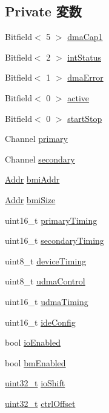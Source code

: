 \subsection*{Private 変数}
\begin{DoxyCompactItemize}
\item 
Bitfield$<$ 5 $>$ \hyperlink{classIdeController_aba4f51816e2ec54f12f4c9724d3b281f}{dmaCap1}
\item 
Bitfield$<$ 2 $>$ \hyperlink{classIdeController_a6bf8072c32ffee0d4d03eb90ce4a3810}{intStatus}
\item 
Bitfield$<$ 1 $>$ \hyperlink{classIdeController_a3f71da290d4bdbfb6f14d5055a556d20}{dmaError}
\item 
Bitfield$<$ 0 $>$ \hyperlink{classIdeController_a12698e64814a9728d71424fcf5148f4d}{active}
\item 
Bitfield$<$ 0 $>$ \hyperlink{classIdeController_ace5af3160a3a76b4a51e864f74b16ae5}{startStop}
\item 
Channel \hyperlink{classIdeController_ab99c7b03cc88be094081c9dee0d4f3d7}{primary}
\item 
Channel \hyperlink{classIdeController_a9ffe401d4b082d4a20f74809ed096f62}{secondary}
\item 
\hyperlink{base_2types_8hh_af1bb03d6a4ee096394a6749f0a169232}{Addr} \hyperlink{classIdeController_aeea2cd1022ed55ebf9ba284ea44b1b3b}{bmiAddr}
\item 
\hyperlink{base_2types_8hh_af1bb03d6a4ee096394a6749f0a169232}{Addr} \hyperlink{classIdeController_a52be8db14c9c7207569db87b8a153c08}{bmiSize}
\item 
uint16\_\-t \hyperlink{classIdeController_ae3a3e441e5eccb9c386260eeb3968878}{primaryTiming}
\item 
uint16\_\-t \hyperlink{classIdeController_a1611c0c216198aa88de03e3ebfd22b43}{secondaryTiming}
\item 
uint8\_\-t \hyperlink{classIdeController_a11159e29742cfa070446c2ae522aadb2}{deviceTiming}
\item 
uint8\_\-t \hyperlink{classIdeController_a3bc817e4be51f2e1aeb1701ce144cbf1}{udmaControl}
\item 
uint16\_\-t \hyperlink{classIdeController_af5a85382debfe463bfebc5ab59624aa5}{udmaTiming}
\item 
uint16\_\-t \hyperlink{classIdeController_accc39274caa412bf5447d8fad2822dda}{ideConfig}
\item 
bool \hyperlink{classIdeController_ab91aa36ae35d81d85815bd14a704c736}{ioEnabled}
\item 
bool \hyperlink{classIdeController_a9e6c0c0f31990b6cde50661d497ab70f}{bmEnabled}
\item 
\hyperlink{Type_8hh_a435d1572bf3f880d55459d9805097f62}{uint32\_\-t} \hyperlink{classIdeController_a717c1373270d47ce8b3da7a0bf9ba29e}{ioShift}
\item 
\hyperlink{Type_8hh_a435d1572bf3f880d55459d9805097f62}{uint32\_\-t} \hyperlink{classIdeController_a6f85d0e8ddf9ba7c01968f1b37725067}{ctrlOffset}
\end{DoxyCompactItemize}



